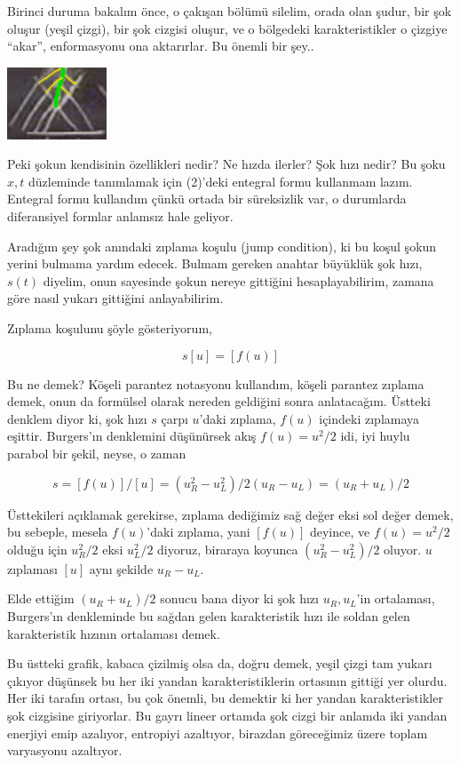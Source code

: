 \documentclass[12pt,fleqn]{article}\usepackage{../../common}
\begin{document}
Birinci duruma bakalım önce, o çakışan bölümü silelim, orada olan şudur,
bir şok oluşur (yeşil çizgi), bir şok cizgisi oluşur, ve o bölgedeki
karakteristikler o çizgiye ``akar'', enformasyonu ona aktarırlar. Bu
önemli bir şey..

\includegraphics[width=8em]{compscieng_2_09_02.png}

Peki şokun kendisinin özellikleri nedir? Ne hızda ilerler? Şok hızı nedir?  Bu
şoku $x,t$ düzleminde tanımlamak için (2)'deki entegral formu kullanmam lazım.
Entegral formu kullandım çünkü ortada bir süreksizlik var, o durumlarda
diferansiyel formlar anlamsız hale geliyor.

Aradığım şey şok anındaki zıplama koşulu (jump condition), ki bu koşul şokun
yerini bulmama yardım edecek. Bulmam gereken anahtar büyüklük şok hızı, $s(t)$
diyelim, onun sayesinde şokun nereye gittiğini hesaplayabilirim, zamana göre
nasıl yukarı gittiğini anlayabilirim.

Zıplama koşulunu şöyle gösteriyorum,

$$
s [u] = [f(u)]
$$

Bu ne demek? Köşeli parantez notasyonu kullandım, köşeli parantez zıplama demek,
onun da formülsel olarak nereden geldiğini sonra anlatacağım. Üstteki denklem
diyor ki, şok hızı $s$ çarpı $u$'daki zıplama, $f(u)$ içindeki zıplamaya
eşittir.  Burgers'ın denklemini düşünürsek akış $f(u) = u^2/2$ idi, iyi huylu
parabol bir şekil, neyse, o zaman

$$
s = [f(u)]/[u] = (u_R^2 - u_L^2) / 2 (u_R-u_L) = (u_R + u_L) / 2
$$

Üsttekileri açıklamak gerekirse, zıplama dediğimiz sağ değer eksi sol değer
demek, bu sebeple, mesela $f(u)$'daki zıplama, yani $[f(u)]$ deyince, ve
$f(u) = u^2/2$ olduğu için $u_R^2/2$ eksi $u_L^2/2$ diyoruz, biraraya koyunca
$(u_R^2 - u_L^2) / 2$ oluyor. $u$ zıplaması $[u]$ aynı şekilde $u_R - u_L$. 

Elde ettiğim $(u_R + u_L) / 2$ sonucu bana diyor ki şok hızı $u_R,u_L$'in
ortalaması, Burgers'ın denkleminde bu sağdan gelen karakteristik hızı
ile soldan gelen karakteristik hızının ortalaması demek.

Bu üstteki grafik, kabaca çizilmiş olsa da, doğru demek, yeşil çizgi tam yukarı
çıkıyor düşünsek bu her iki yandan karakteristiklerin ortasının gittiği yer
olurdu. Her iki tarafın ortası, bu çok önemli, bu demektir ki her yandan
karakteristikler şok cizgisine giriyorlar. Bu gayrı lineer ortamda şok cizgi
bir anlamda iki yandan enerjiyi emip azalıyor, entropiyi azaltıyor, birazdan
göreceğimiz üzere toplam varyasyonu azaltıyor. 
\end{document}
